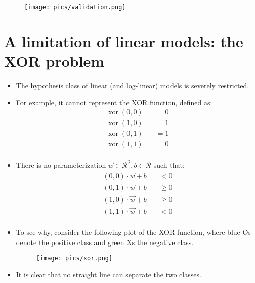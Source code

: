  \begin{figure}[htb]
	\centering
	 \texttt{[image: pics/validation.png]}
\end{figure}



\section{A limitation of linear models: the XOR problem}
\begin{itemize}
\item The hypothesis class of linear (and log-linear) models is severely restricted.
\item For example, it cannot represent the XOR function, defined as:
\begin{equation}
 \begin{split}
  \operatorname{xor}(0,0) \quad & = 0 \\
  \operatorname{xor}(1,0) \quad & = 1 \\
  \operatorname{xor}(0,1) \quad & = 1 \\
  \operatorname{xor}(1,1) \quad & = 0 \\
 \end{split}
\end{equation}
\item There is no parameterization $\vec{w} \in \mathcal{R}^2, b \in \mathcal{R}$ such that:
\begin{equation}
 \begin{split}
  (0,0) \cdot \vec{w} +b \quad & < 0 \\
  (0,1) \cdot \vec{w} +b \quad & \geq 0 \\
  (1,0) \cdot \vec{w} +b \quad & \geq 0 \\
  (1,1) \cdot \vec{w} +b \quad & < 0 \\
 \end{split}
\end{equation}
\item To see why, consider the following plot of the XOR function, where blue Os denote the positive class and green Xs the negative class.
\begin{figure}[htb]
	\centering
	 \texttt{[image: pics/xor.png]}
\end{figure}
\item It is clear that no straight line can separate the two classes.
\end{itemize}


